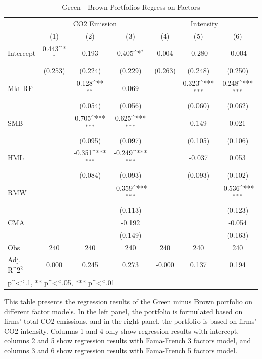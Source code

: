 \documentclass[12pt]{article}
\begin{document}
\begin{table}[!ht]
\centering
\footnotesize
\caption{Green - Brown Portfolios Regress on Factors}
\label{tab: green-brown}
{
\def\sym#1{\ifmmode^{#1}\else\(^{#1}\)\fi}
\begin{tabular}{@{\extracolsep{2pt}}l*{6}{c}@{}}
\toprule
& \multicolumn{3}{c}{CO2 Emission} & \multicolumn{3}{c}{Intensity} \\
\cline{2-4}
\cline{5-7}
 & (1) & (2) & (3) & (4) & (5) & (6) \\
\hline
Intercept & 0.443\sym{*} & 0.193 & 0.405\sym{*} & 0.004 & -0.280 & -0.004 \\
 & (0.253) & (0.224) & (0.229) & (0.263) & (0.248) & (0.250) \\
Mkt-RF &  & 0.128\sym{**} & 0.069 &  & 0.323\sym{***} & 0.248\sym{***} \\
 &  & (0.054) & (0.056) &  & (0.060) & (0.062) \\
SMB &  & 0.705\sym{***} & 0.625\sym{***} &  & 0.149 & 0.021 \\
 &  & (0.095) & (0.097) &  & (0.105) & (0.106) \\
HML &  & -0.351\sym{***} & -0.249\sym{***} &  & -0.037 & 0.053 \\
 &  & (0.084) & (0.093) &  & (0.093) & (0.102) \\
RMW &  &  & -0.359\sym{***} &  &  & -0.536\sym{***} \\
 &  &  & (0.113) &  &  & (0.123) \\
CMA &  &  & -0.192 &  &  & -0.054 \\
 &  &  & (0.149) &  &  & (0.163) \\

\hline
Obs & 240 & 240 & 240 & 240 & 240 & 240 \\
Adj. R\sym{2} & 0.000 & 0.245 & 0.273 & -0.000 & 0.137 & 0.194 \\
\bottomrule
\multicolumn{7}{l}{\footnotesize * p\sym{<}.1, ** p\sym{<}.05, *** p\sym{<}.01}
\end{tabular}
}
\begin{tablenotes}
    \item This table presents the regression results of the Green minus Brown portfolio on different factor models. In the left panel, the portfolio is formulated based on firms' total CO2 emissions, and in the right panel, the portfolio is based on firms' CO2 intensity. Columns 1 and 4 only show regression results with intercept, columns 2 and 5 show regression results with Fama-French 3 factors model, and columns 3 and 6 show regression results with Fama-French 5 factors model.
\end{tablenotes}
\end{table}
\end{document}
